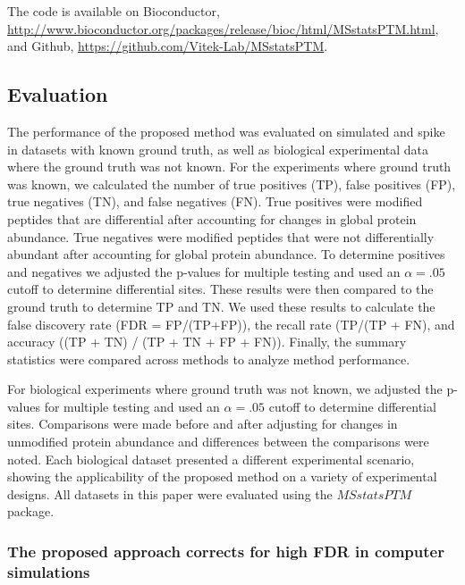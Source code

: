 \documentclass[mcp]{article}
\numberwithin{table}{section}
\begin{document}
The code is available on Bioconductor, \url{http://www.bioconductor.org/packages/release/bioc/html/MSstatsPTM.html}, and Github, \url{https://github.com/Vitek-Lab/MSstatsPTM}.

\subsection*{Evaluation}

The performance of the proposed method was evaluated on simulated and spike in datasets with known ground truth, as well as biological experimental data where the ground truth was not known. For the experiments where ground truth was known, we calculated the number of true positives (TP), false positives (FP), true negatives (TN), and false negatives (FN). True positives were modified peptides that are differential after accounting for changes in global protein abundance. True negatives were modified peptides that were not differentially abundant after accounting for global protein abundance. To determine positives and negatives we adjusted the p-values for multiple testing and used an $\alpha=.05$ cutoff to determine differential sites. These results were then compared to the ground truth to determine TP and TN. We used these results to calculate the false discovery rate (FDR = FP/(TP+FP)), the recall rate (TP/(TP + FN), and accuracy ((TP + TN) / (TP + TN + FP + FN)). Finally, the summary statistics were compared across methods to analyze method performance. 

For biological experiments where ground truth was not known, we adjusted the p-values for multiple testing and used an $\alpha=.05$ cutoff to determine differential sites. Comparisons were made before and after adjusting for changes in unmodified protein abundance and differences between the comparisons were noted. Each biological dataset presented a different experimental scenario, showing the applicability of the proposed method on a variety of experimental designs. All datasets in this paper were evaluated using the $MSstatsPTM$ package.

\subsubsection*{The proposed approach corrects for high FDR in computer simulations}
\end{document}
